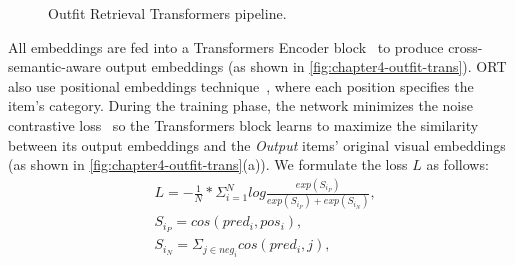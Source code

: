 \begin{figure}[h!]
    \centering
    \hspace{0.5cm}
    \caption{Outfit Retrieval Transformers pipeline.}
    \label{fig:chapter4-outfit-trans}
\end{figure}

All embeddings are fed into a Transformers Encoder block~\cite{Vaswani-NeurIPS2017-Attention} to produce cross-semantic-aware output embeddings (as shown in \autoref{fig:chapter4-outfit-trans}). ORT also use positional embeddings technique~\cite{Vaswani-NeurIPS2017-Attention}, where each position specifies the item's category. During the training phase, the network minimizes the noise contrastive loss~\cite{Lai-Arxiv2019-Contrastive} so the Transformers block learns to maximize the similarity between its output embeddings and the \textit{Output} items' original visual embeddings (as shown in \autoref{fig:chapter4-outfit-trans}(a)). We formulate the loss $L$ as follows:
\begin{align}
    & L = -\frac{1}{N}*\Sigma_{i=1}^{N} log{\frac{exp(S_{i_P})}{exp(S_{i_P}) + exp(S_{i_N})}},\\
    & S_{i_P} = cos(pred_i, pos_i),\\
    & S_{i_N} = \Sigma_{j \in {neg_i}} cos(pred_i, j),
\end{align}

